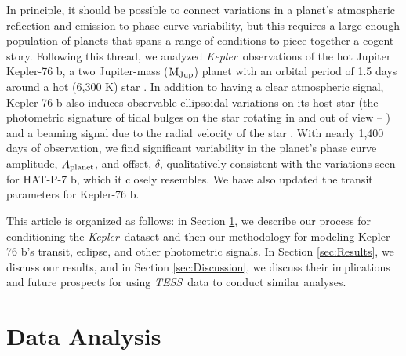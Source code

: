 \documentclass[manuscript]{aastex62}
\newcommand{\kepler}{{\it Kepler}}
\newcommand{\tess}{{\it TESS}}
\begin{document}
In principle, it should be possible to connect variations in a planet's atmospheric reflection and emission to phase curve variability, but this requires a large enough population of planets that spans a range of conditions to piece together a cogent story. Following this thread, we analyzed \kepler\ observations of the hot Jupiter Kepler-76 b, a two Jupiter-mass (${\rm M_{Jup}}$) planet with an orbital period of 1.5 days around a hot (6,300 K) star \citep{2013ApJ...771...26F}. In addition to having a clear atmospheric signal, Kepler-76 b also induces observable ellipsoidal variations on its host star (the photometric signature of tidal bulges on the star rotating in and out of view -- \citealp{2010ApJ...713L.145W}) and a beaming signal due to the radial velocity of the star \citep{2003ApJ...588L.117L}. With nearly 1,400 days of observation, we find significant variability in the planet's phase curve amplitude, $A_{\rm planet}$, and offset, $\delta$, qualitatively consistent with the variations seen for HAT-P-7 b, which it closely resembles. We have also updated the transit parameters for Kepler-76 b.

This article is organized as follows: in Section \ref{sec:Data_Analysis}, we describe our process for conditioning the \kepler\ dataset and then our methodology for modeling Kepler-76 b's transit, eclipse, and other photometric signals. In Section \ref{sec:Results}, we discuss our results, and in Section \ref{sec:Discussion}, we discuss their implications and future prospects for using \tess\ data to conduct similar analyses.

\section{Data Analysis}
\label{sec:Data_Analysis}
\end{document}

